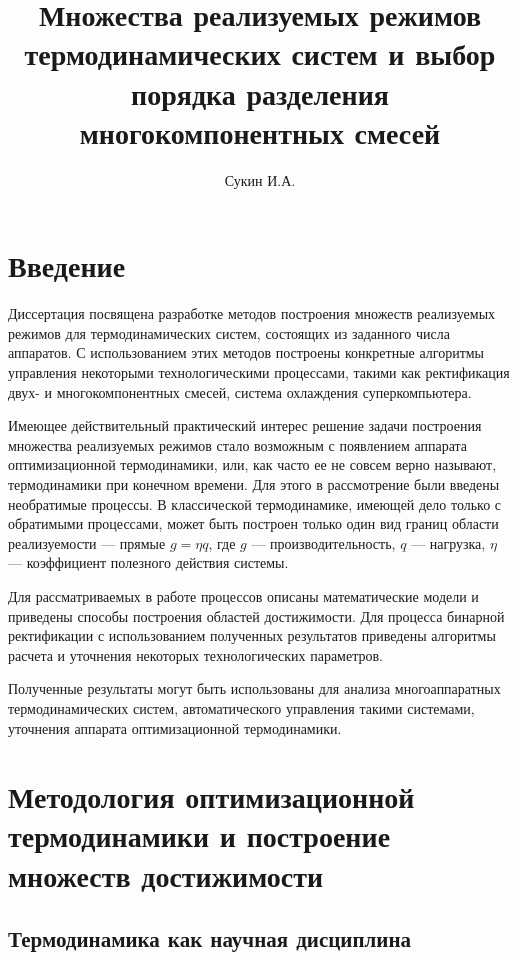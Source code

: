 \documentclass{article}
\begin{document}
\title{Множества реализуемых режимов термодинамических систем и выбор порядка разделения многокомпонентных смесей}
\author{Сукин И.А.}
\maketitle

\tableofcontents

\section*{Введение}

Диссертация посвящена разработке методов построения множеств реализуемых режимов для термодинамических систем, состоящих из заданного числа аппаратов. С использованием этих методов построены конкретные алгоритмы управления некоторыми технологическими процессами, такими как ректификация двух- и многокомпонентных смесей, система охлаждения суперкомпьютера.

Имеющее действительный практический интерес решение задачи построения множества реализуемых режимов стало возможным с появлением аппарата оптимизационной термодинамики, или, как часто ее не совсем верно называют, термодинамики при конечном времени. Для этого в рассмотрение были введены необратимые процессы. В классической термодинамике, имеющей дело только с обратимыми процессами, может быть построен только один вид границ области реализуемости --- прямые $g = \eta q$, где $g$ --- производительность, $q$ --- нагрузка, $\eta$ --- коэффициент полезного действия системы.

Для рассматриваемых в работе процессов описаны математические модели и приведены способы построения областей достижимости. Для процесса бинарной ректификации с использованием полученных результатов приведены алгоритмы расчета и уточнения некоторых технологических параметров.

Полученные результаты могут быть использованы для анализа многоаппаратных термодинамических систем, автоматического управления такими системами, уточнения аппарата оптимизационной термодинамики.

\section{Методология оптимизационной термодинамики и построение множеств достижимости}

	\subsection{Термодинамика как научная дисциплина}
	
\end{document}
